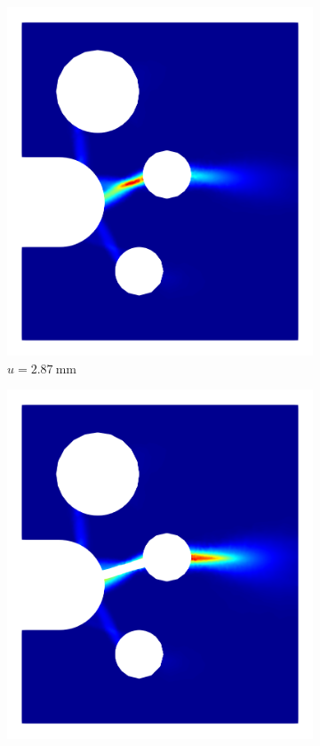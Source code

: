 \begin{figure}[!htb]
  \begin{subfigure}{0.17\textwidth}
    \centering
    \includegraphics[width=\textwidth,scale=0.5]{Chapter5/figures/SFC/W_pl_1}
    \caption{$u = \SI{2.87}{\milli\meter}$}
    \label{fig: Chapter5/SFC/Wp_1}
  \end{subfigure}
  \hspace{0.03\textwidth}
  \begin{subfigure}{0.17\textwidth}
    \centering
    \includegraphics[width=\textwidth,scale=0.5]{Chapter5/figures/SFC/W_pl_2}

\end{subfigure}
\end{figure}
